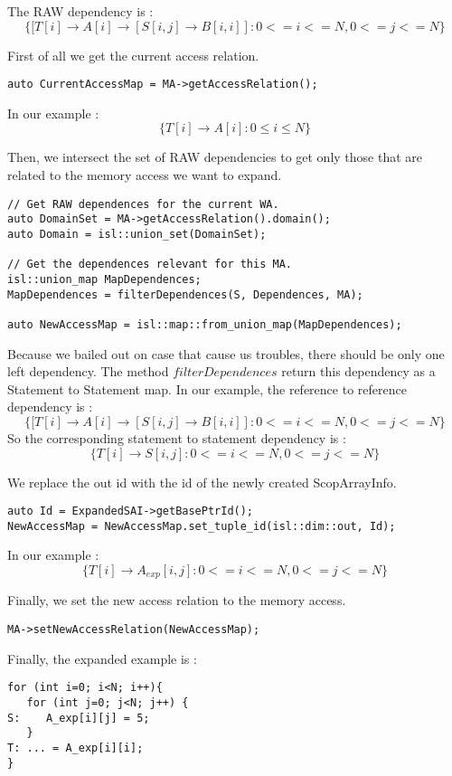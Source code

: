 The RAW dependency is :
\[
\{[T[i] \rightarrow A[i] \rightarrow [S[i,j] \rightarrow B[i,i]]:0<=i<=N,0<=j<=N\}
\]

First of all we get the current access relation.
\begin{lstlisting}[frame=single]
auto CurrentAccessMap = MA->getAccessRelation();
\end{lstlisting}
In our example :
\[
\{ T[i] \rightarrow A[i] : 0 \le i \le N\}
\]

Then, we intersect the set of RAW dependencies to get only those that are related to the memory access we want to expand.
\begin{lstlisting}[frame=single]
// Get RAW dependences for the current WA.
auto DomainSet = MA->getAccessRelation().domain();
auto Domain = isl::union_set(DomainSet);

// Get the dependences relevant for this MA.
isl::union_map MapDependences;
MapDependences = filterDependences(S, Dependences, MA);

auto NewAccessMap = isl::map::from_union_map(MapDependences);
\end{lstlisting}
Because we bailed out on case that cause us troubles, there should be only one left dependency. The method $filterDependences$ return this dependency as a Statement to Statement map.
In our example, the reference to reference dependency is :
\[
\{[T[i] \rightarrow A[i] \rightarrow [S[i,j] \rightarrow B[i,i]]:0<=i<=N,0<=j<=N\}
\]
So the corresponding statement to statement dependency is :
\[
\{T[i] \rightarrow S[i,j] : 0<=i<=N,0<=j<=N\}
\]

We replace the out id with the id of the newly created ScopArrayInfo.
\begin{lstlisting}[frame=single]
auto Id = ExpandedSAI->getBasePtrId();
NewAccessMap = NewAccessMap.set_tuple_id(isl::dim::out, Id);
\end{lstlisting}
In our example :
\[
\{T[i] \rightarrow A_{exp}[i,j] : 0<=i<=N,0<=j<=N\}
\]

Finally, we set the new access relation to the memory access.
\begin{lstlisting}[frame=single]
MA->setNewAccessRelation(NewAccessMap);
\end{lstlisting}

Finally, the expanded example is :
\begin{lstlisting}[frame=single]
for (int i=0; i<N; i++){
   for (int j=0; j<N; j++) {
S:    A_exp[i][j] = 5;
   }
T: ... = A_exp[i][i];
}
\end{lstlisting}

